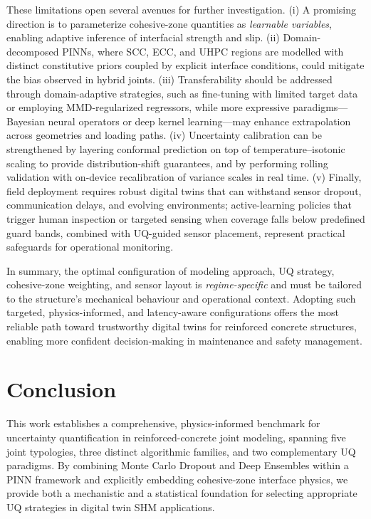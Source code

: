\documentclass{article}
\begin{document}
These limitations open several avenues for further investigation. 
(i) A promising direction is to parameterize cohesive-zone quantities as \emph{learnable variables}, enabling adaptive inference of interfacial strength and slip. 
(ii) Domain-decomposed PINNs, where SCC, ECC, and UHPC regions are modelled with distinct constitutive priors coupled by explicit interface conditions, could mitigate the bias observed in hybrid joints. 
(iii) Transferability should be addressed through domain-adaptive strategies, such as fine-tuning with limited target data or employing MMD-regularized regressors, while more expressive paradigms—Bayesian neural operators or deep kernel learning—may enhance extrapolation across geometries and loading paths. 
(iv) Uncertainty calibration can be strengthened by layering conformal prediction on top of temperature–isotonic scaling to provide distribution-shift guarantees, and by performing rolling validation with on-device recalibration of variance scales in real time. 
(v) Finally, field deployment requires robust digital twins that can withstand sensor dropout, communication delays, and evolving environments; active-learning policies that trigger human inspection or targeted sensing when coverage falls below predefined guard bands, combined with UQ-guided sensor placement, represent practical safeguards for operational monitoring.


In summary, the optimal configuration of modeling approach, UQ strategy, cohesive-zone weighting, and sensor layout is \emph{regime-specific} and must be tailored to the structure’s mechanical behaviour and operational context. Adopting such targeted, physics-informed, and latency-aware configurations offers the most reliable path toward trustworthy digital twins for reinforced concrete structures, enabling more confident decision-making in maintenance and safety management.



\section{Conclusion}
\label{sec:conclusion}

This work establishes a comprehensive, physics-informed benchmark for uncertainty quantification in reinforced-concrete joint modeling, spanning five joint typologies, three distinct algorithmic families, and two complementary UQ paradigms. By combining Monte Carlo Dropout and Deep Ensembles within a PINN framework and explicitly embedding cohesive-zone interface physics, we provide both a mechanistic and a statistical foundation for selecting appropriate UQ strategies in digital twin SHM applications.
\end{document}
